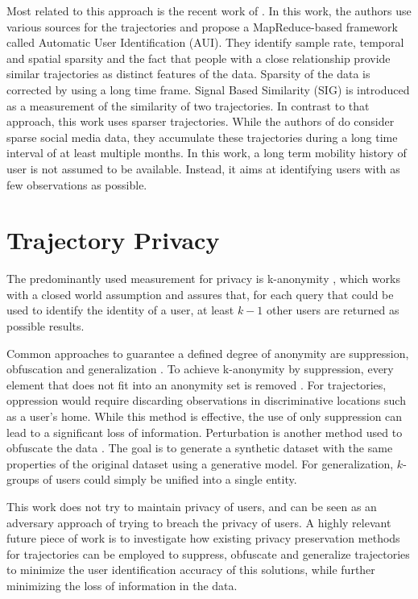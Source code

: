 Most related to this approach is the recent work of \citeauthor{Cao2016} \cite{Cao2016}. In this work, the authors use various sources for the trajectories and propose a MapReduce-based framework called Automatic User Identification (AUI). They identify sample rate, temporal and spatial sparsity and the fact that people with a close relationship provide similar trajectories as distinct features of the data. Sparsity of the data is corrected by using a long time frame. Signal Based Similarity (SIG) is introduced as a measurement of the similarity of two trajectories. In contrast to that approach, this work uses sparser trajectories. While the authors of \citeauthor{Cao2016} do consider sparse social media data, they accumulate these trajectories during a long time interval of at least multiple months. In this work, a long term mobility history of user is not assumed to be  available. Instead, it aims at identifying users with as few observations as possible.

\section{Trajectory Privacy}
The predominantly used measurement for privacy is k-anonymity \cite{Sweeney2002}, which works with a closed world assumption and assures that, for each query that could be used to identify the identity of a user, at least $k-1$ other users are returned as possible results.

Common approaches to guarantee a defined degree of anonymity are suppression, obfuscation and generalization \cite{Hashem2007}. To achieve k-anonymity by suppression, every element that does not fit into an anonymity set is removed \cite{Byun2007, Lefevre2006}. For trajectories, oppression would require discarding observations in discriminative locations such as a user's home. While this method is effective, the use of only suppression can lead to a significant loss of information. Perturbation is another method used to obfuscate the data \cite{Aggarwal2004}. The goal is to generate a synthetic dataset with the same properties of the original dataset using a generative model. For generalization, $k$-groups of users could simply be unified into a single entity.

This work does not try to maintain privacy of users, and can be seen as an adversary approach of trying to breach the privacy of users. A highly relevant future piece of work is to investigate how existing privacy preservation methods for trajectories can be employed to suppress, obfuscate and generalize trajectories to minimize the user identification accuracy of this solutions, while further minimizing the loss of information in the data.


